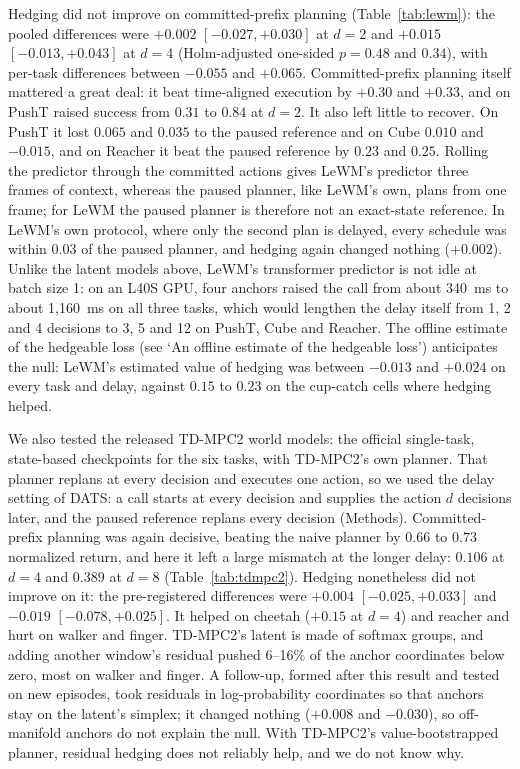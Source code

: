 \documentclass[aps,physrev,\manuscriptlayout,superscriptaddress,
  longbibliography,amsmath,amssymb]{revtex4-2}
\begin{document}
Hedging did not improve on committed-prefix planning (Table~\ref{tab:lewm}): the pooled differences were $+0.002$ $[-0.027, +0.030]$ at $d=2$ and $+0.015$ $[-0.013, +0.043]$ at $d=4$ (Holm-adjusted one-sided $p=0.48$ and $0.34$), with per-task differences between $-0.055$ and $+0.065$. Committed-prefix planning itself mattered a great deal: it beat time-aligned execution by $+0.30$ and $+0.33$, and on PushT raised success from $0.31$ to $0.84$ at $d=2$. It also left little to recover. On PushT it lost $0.065$ and $0.035$ to the paused reference and on Cube $0.010$ and $-0.015$, and on Reacher it beat the paused reference by $0.23$ and $0.25$. Rolling the predictor through the committed actions gives LeWM's predictor three frames of context, whereas the paused planner, like LeWM's own, plans from one frame; for LeWM the paused planner is therefore not an exact-state reference. In LeWM's own protocol, where only the second plan is delayed, every schedule was within $0.03$ of the paused planner, and hedging again changed nothing ($+0.002$). Unlike the latent models above, LeWM's transformer predictor is not idle at batch size 1: on an L40S GPU, four anchors raised the call from about 340~ms to about 1,160~ms on all three tasks, which would lengthen the delay itself from 1, 2 and 4 decisions to 3, 5 and 12 on PushT, Cube and Reacher. The offline estimate of the hedgeable loss (see `An offline estimate of the hedgeable loss') anticipates the null: LeWM's estimated value of hedging was between $-0.013$ and $+0.024$ on every task and delay, against $0.15$ to $0.23$ on the cup-catch cells where hedging helped.

We also tested the released TD-MPC2 world models\cite{hansen2023tdmpc2}: the official single-task, state-based checkpoints for the six tasks, with TD-MPC2's own planner. That planner replans at every decision and executes one action, so we used the delay setting of DATS\cite{chen2020dats}: a call starts at every decision and supplies the action $d$ decisions later, and the paused reference replans every decision (Methods). Committed-prefix planning was again decisive, beating the naive planner by $0.66$ to $0.73$ normalized return, and here it left a large mismatch at the longer delay: $0.106$ at $d=4$ and $0.389$ at $d=8$ (Table~\ref{tab:tdmpc2}). Hedging nonetheless did not improve on it: the pre-registered differences were $+0.004$ $[-0.025, +0.033]$ and $-0.019$ $[-0.078, +0.025]$. It helped on cheetah ($+0.15$ at $d=4$) and reacher and hurt on walker and finger. TD-MPC2's latent is made of softmax groups, and adding another window's residual pushed 6--16\% of the anchor coordinates below zero, most on walker and finger. A follow-up, formed after this result and tested on new episodes, took residuals in log-probability coordinates so that anchors stay on the latent's simplex; it changed nothing ($+0.008$ and $-0.030$), so off-manifold anchors do not explain the null. With TD-MPC2's value-bootstrapped planner, residual hedging does not reliably help, and we do not know why.
\end{document}
